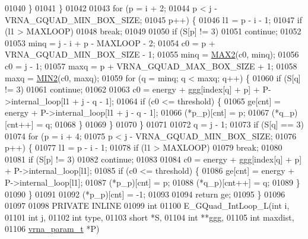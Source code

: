 \begin{DoxyCode}
01040     \}
01041   \}
01042 
01043   \textcolor{keywordflow}{for} (p = i + 2;
01044        p < j - VRNA\_GQUAD\_MIN\_BOX\_SIZE;
01045        p++) \{
01046     l1 = p - i - 1;
01047     \textcolor{keywordflow}{if} (l1 > MAXLOOP)
01048       \textcolor{keywordflow}{break};
01049 
01050     \textcolor{keywordflow}{if} (S[p] != 3)
01051       \textcolor{keywordflow}{continue};
01052 
01053     minq  = j - i + p - MAXLOOP - 2;
01054     c0    = p + VRNA\_GQUAD\_MIN\_BOX\_SIZE - 1;
01055     minq  = \hyperlink{group__utils_ga33297b3679c713b0c4d897cd0fe3b122}{MAX2}(c0, minq);
01056     c0    = j - 1;
01057     maxq  = p + VRNA\_GQUAD\_MAX\_BOX\_SIZE + 1;
01058     maxq  = \hyperlink{group__utils_gae0b9cd0ce090bd69b951aa73e8fa4f7d}{MIN2}(c0, maxq);
01059     \textcolor{keywordflow}{for} (q = minq; q < maxq; q++) \{
01060       \textcolor{keywordflow}{if} (S[q] != 3)
01061         \textcolor{keywordflow}{continue};
01062 
01063       c0 = energy + ggg[index[q] + p] + P->internal\_loop[l1 + j - q - 1];
01064       \textcolor{keywordflow}{if} (c0 <= threshold) \{
01065         ge[cnt]       = energy + P->internal\_loop[l1 + j - q - 1];
01066         (*p\_p)[cnt]   = p;
01067         (*q\_p)[cnt++] = q;
01068       \}
01069     \}
01070   \}
01071 
01072   q = j - 1;
01073   \textcolor{keywordflow}{if} (S[q] == 3)
01074     \textcolor{keywordflow}{for} (p = i + 4;
01075          p < j - VRNA\_GQUAD\_MIN\_BOX\_SIZE;
01076          p++) \{
01077       l1 = p - i - 1;
01078       \textcolor{keywordflow}{if} (l1 > MAXLOOP)
01079         \textcolor{keywordflow}{break};
01080 
01081       \textcolor{keywordflow}{if} (S[p] != 3)
01082         \textcolor{keywordflow}{continue};
01083 
01084       c0 = energy + ggg[index[q] + p] + P->internal\_loop[l1];
01085       \textcolor{keywordflow}{if} (c0 <= threshold) \{
01086         ge[cnt]       = energy + P->internal\_loop[l1];
01087         (*p\_p)[cnt]   = p;
01088         (*q\_p)[cnt++] = q;
01089       \}
01090     \}
01091 
01092   (*p\_p)[cnt] = -1;
01093 
01094   \textcolor{keywordflow}{return} ge;
01095 \}
01096 
01097 
01098 PRIVATE INLINE
01099 \textcolor{keywordtype}{int}
01100 E\_GQuad\_IntLoop\_L(\textcolor{keywordtype}{int}           i,
01101                   \textcolor{keywordtype}{int}           j,
01102                   \textcolor{keywordtype}{int}           type,
01103                   \textcolor{keywordtype}{short}         *S,
01104                   \textcolor{keywordtype}{int}           **ggg,
01105                   \textcolor{keywordtype}{int}           maxdist,
01106                   \hyperlink{group__energy__parameters_structvrna__param__s}{vrna\_param\_t}  *P)

\end{DoxyCode}
